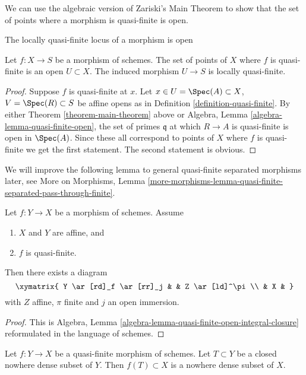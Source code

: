 \noindent
We can use the algebraic version of Zariski's Main Theorem to show that
the set of points where a morphism is quasi-finite is open.

\begin{lemma}
\label{lemma-quasi-finite-points-open}
\begin{slogan}
The locally quasi-finite locus of a morphism is open
\end{slogan}
Let $f : X \to S$ be a morphism of schemes.
The set of points of $X$ where $f$ is quasi-finite is an open
$U \subset X$. The induced morphism $U \to S$ is locally quasi-finite.
\end{lemma}

\begin{proof}
Suppose $f$ is quasi-finite at $x$.
Let $x \in U = \Spec(A) \subset X$, $V = \Spec(R) \subset S$
be affine opens as in Definition \ref{definition-quasi-finite}.
By either Theorem \ref{theorem-main-theorem} above or
Algebra, Lemma \ref{algebra-lemma-quasi-finite-open},
the set of primes $\mathfrak q$ at which $R \to A$ is quasi-finite
is open in $\Spec(A)$. Since these all correspond to points
of $X$ where $f$ is quasi-finite we get the first statement.
The second statement is obvious.
\end{proof}

\noindent
We will improve the following lemma to general quasi-finite separated
morphisms later, see
More on Morphisms, Lemma
\ref{more-morphisms-lemma-quasi-finite-separated-pass-through-finite}.

\begin{lemma}
\label{lemma-quasi-finite-affine}
Let $f : Y \to X$ be a morphism of schemes.
Assume
\begin{enumerate}
\item $X$ and $Y$ are affine, and
\item $f$ is quasi-finite.
\end{enumerate}
Then there exists a diagram
$$
\xymatrix{
Y \ar[rd]_f \ar[rr]_j & & Z \ar[ld]^\pi \\
& X &
}
$$
with $Z$ affine, $\pi$ finite and $j$ an open immersion.
\end{lemma}

\begin{proof}
This is
Algebra, Lemma \ref{algebra-lemma-quasi-finite-open-integral-closure}
reformulated in the language of schemes.
\end{proof}

\begin{lemma}
\label{lemma-image-nowhere-dense-quasi-finite}
Let $f : Y \to X$ be a quasi-finite morphism of schemes.
Let $T \subset Y$ be a closed nowhere dense subset of $Y$.
Then $f(T) \subset X$ is a nowhere dense subset of $X$.
\end{lemma}

